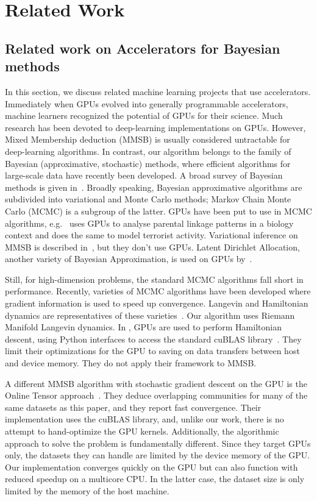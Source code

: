 \section{Related Work}

\subsection{Related work on Accelerators for Bayesian methods}

In this section, we discuss related machine learning projects that use
accelerators.
Immediately when GPUs evolved into generally programmable accelerators, machine
learners recognized the potential of GPUs for their science.
Much research
has been devoted to deep-learning implementations on GPUs. However, Mixed
Membership deduction (MMSB) is usually considered untractable for deep-learning
algorithms. In contrast, our algorithm belongs to the family of Bayesian
(approximative, stochastic) methods, where efficient algorithms for large-scale
data have recently been developed. A broad survey of Bayesian methods is given
in~\cite{DBLP:journals/corr/Zhu0H14}. Broadly speaking, Bayesian approximative
algorithms are subdivided into variational and Monte Carlo methods; Markov
Chain Monte Carlo (MCMC) is a subgroup of the latter. GPUs have been put to
use in MCMC algorithms, e.g.\ \cite{journals/bioinformatics/MedlarGSBK13}
uses GPUs to analyse parental linkage patterns in a biology context and
\cite{DBLP:journals/csda/WhiteP14} does the same to model terrorist activity.
Variational inference on MMSB is described
in~\cite{DBLP:conf/nips/GopalanMGFB12}, but they don't use GPUs. Latent
Dirichlet Allocation, another variety of Bayesian Approximation, is used on
GPUs by~\cite{DBLP:conf/nips/YanXQ09}.

Still, for high-dimension problems, the standard MCMC algorithms fall short in
performance. Recently, varieties of MCMC algorithms have been developed where
gradient information is used to speed up convergence. Langevin and Hamiltonian
dynamics are representatives of these
varieties~\cite{Girolami_riemannmanifold}.  Our algorithm uses Riemann Manifold
Langevin dynamics. In \cite{beam2014fast}, GPUs are used to perform Hamiltonian
descent, using Python interfaces to access the standard cuBLAS
library~\cite{cuBLAS}. They limit their optimizations for the GPU to
saving on data transfers between host and device memory. They do not apply
their framework to MMSB.

A different MMSB algorithm with stochastic gradient descent on the GPU is
the Online Tensor approach~\cite{DBLP:journals/corr/HuangNHVA13}. They deduce
overlapping communities for many of the same datasets as this paper, and they
report fast convergence. Their implementation uses the cuBLAS
library, and, unlike our work, there is no attempt to hand-optimize the GPU
kernels. Additionally, the algorithmic approach to solve the problem is
fundamentally different.
Since they target GPUs only, the datasets they
can handle are limited by the device memory of the GPU. Our implementation converges
quickly on the GPU but can also function with reduced speedup on a multicore
CPU. In the latter case, the dataset
size is only limited by the memory of the host machine.

